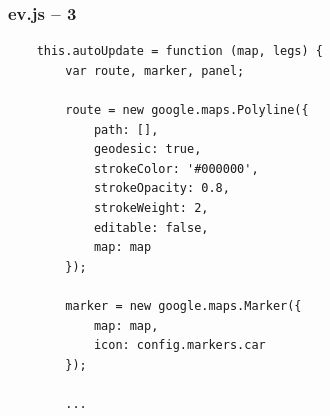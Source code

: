 \begin{frame}[fragile]
\frametitle{ev.js – 3}

\begin{verbatim}
    this.autoUpdate = function (map, legs) {
        var route, marker, panel;

        route = new google.maps.Polyline({
            path: [],
            geodesic: true,
            strokeColor: '#000000',
            strokeOpacity: 0.8,
            strokeWeight: 2,
            editable: false,
            map: map
        });

        marker = new google.maps.Marker({
            map: map,
            icon: config.markers.car
        });

        ...
\end{verbatim}

\end{frame}
\clearpage




